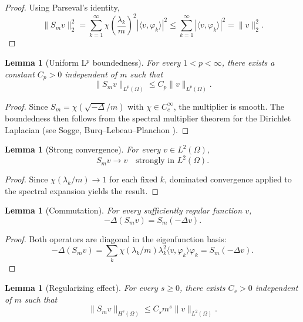 \documentclass[11pt,letterpaper]{amsart}
\newtheorem{lemma}[theorem]{Lemma}
\begin{document}
\begin{proof}
Using Parseval's identity,
\[
\|S_m v\|_2^2
=
\sum_{k=1}^\infty
\chi\!\left(\frac{\lambda_k}{m}\right)^2
|\langle v, \varphi_k\rangle|^2
\le
\sum_{k=1}^\infty
|\langle v, \varphi_k\rangle|^2
=
\|v\|_2^2.
\]
\end{proof}

\begin{lemma}[Uniform L$^p$ boundedness]
For every $1 < p < \infty$, there exists a constant $C_p>0$
independent of $m$ such that
\begin{equation}\label{Lp-bound}
\|S_m v\|_{L^p(\Omega)} \le C_p \|v\|_{L^p(\Omega)}.
\end{equation}
\end{lemma}

\begin{proof}
Since $S_m=\chi(\sqrt{-\Delta}/m)$ with $\chi \in C_c^\infty$,
the multiplier is smooth. The boundedness then follows from the
spectral multiplier theorem for the Dirichlet Laplacian
(see Sogge\cite{Sogge},  Burq--Lebeau--Planchon \cite{BurqLebeauPlanchon}).
\end{proof}

\begin{lemma}[Strong convergence]
For every $v \in L^2(\Omega)$,
\begin{equation}\label{Sm-conv}
S_m v \to v \quad \text{strongly in } L^2(\Omega).
\end{equation}
\end{lemma}

\begin{proof}
Since $\chi(\lambda_k/m)\to1$ for each fixed $k$,
dominated convergence applied to the spectral expansion yields
the result.
\end{proof}

\begin{lemma}[Commutation]
For every sufficiently regular function $v$,
\begin{equation}\label{commutation}
-\Delta(S_m v) = S_m(-\Delta v).
\end{equation}
\end{lemma}

\begin{proof}
Both operators are diagonal in the eigenfunction basis:
\[
-\Delta(S_m v)
=
\sum_{k}
\chi(\lambda_k/m)\lambda_k^2
\langle v,\varphi_k\rangle\varphi_k
=
S_m(-\Delta v).
\]
\end{proof}

\begin{lemma}[Regularizing effect]
For every $s \ge 0$, there exists $C_s>0$ independent of $m$ such that
\begin{equation}\label{regularization}
\|S_m v\|_{H^s(\Omega)} \le C_s m^s \|v\|_{L^2(\Omega)}.
\end{equation}
\end{lemma}
\end{document}
